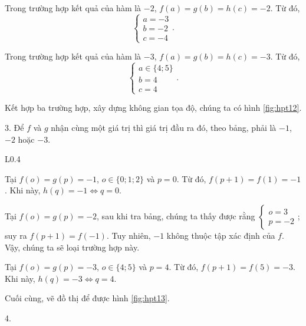 Trong trường hợp kết quả của hàm là $-2$, $f(a) = g(b) = h(c) = -2$. Từ đó,
$$
\begin{cases}
   a = -3\\
   b = -2\\
   c = -4
\end{cases}.
$$

Trong trường hợp kết quả của hàm là $-3$, $f(a) = g(b) = h(c) = -3$. Từ đó,
$$
\begin{cases}
   a \in \{4; 5\}\\
   b = 4\\
   c = 4
\end{cases}.
$$

Kết hợp ba trường hợp, xây dựng không gian tọa độ, chúng ta có hình \ref{fig:hpt12}.

3. Để $f$ và $g$ nhận cùng một giá trị thì giá trị đầu ra đó, theo bảng, phải là $-1$, $-2$ hoặc $-3$.

\begin{wrapfigure}{L}{0.4\textwidth}
   \centering
   \caption{Đồ thị phần 3 bài \ref{ex:hpt1}}
   \label{fig:hpt13}
\end{wrapfigure}

Tại $f(o) = g(p) = -1$, $o \in \{0; 1; 2\}$ và $p = 0$. Từ đó, $f(p + 1) = f(1) = -1$. Khi này, $h(q) = -1 \iff q = 0$.

Tại $f(o) = g(p) = -2$, sau khi tra bảng, chúng ta thấy được rằng $\begin{cases}o = 3\\p = -2\end{cases}$; suy ra $f(p + 1) = f(-1)$. Tuy nhiên, $-1$ không thuộc tập xác định của $f$. Vậy, chúng ta sẽ loại trường hợp này.

Tại $f(o) = g(p) = -3$, $o \in \{4; 5\}$ và $p = 4$. Từ đó, $f(p + 1) = f(5) = -3$. Khi này, $h(q) = -3 \iff q = 4$.

Cuối cùng, vẽ đồ thị để được hình \ref{fig:hpt13}.

4. 